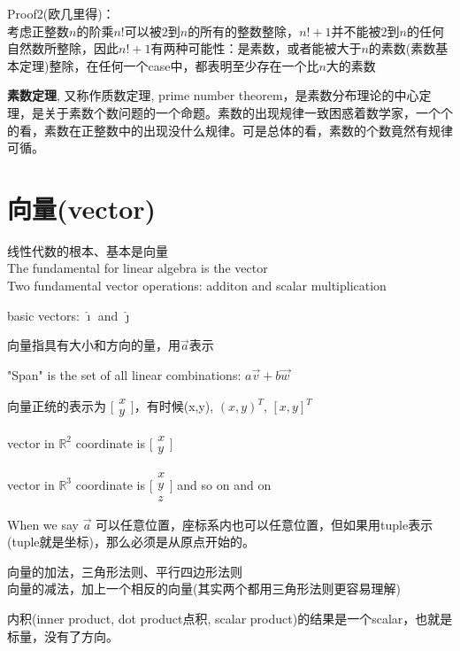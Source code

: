 \documentclass[../main.tex]{subfiles}
\begin{document}
Proof2(欧几里得)：\\
考虑正整数$n$的阶乘$n!$可以被$2$到$n$的所有的整数整除，$n!+1$并不能被$2$到$n$的任何自然数所整除，因此$n!+1$有两种可能性：是素数，或者能被大于$n$的素数(素数基本定理)整除，在任何一个case中，都表明至少存在一个比$n$大的素数

\textbf{素数定理}, 又称作质数定理, prime number theorem，是素数分布理论的中心定理，是关于素数个数问题的一个命题。素数的出现规律一致困惑着数学家，一个个的看，素数在正整数中的出现没什么规律。可是总体的看，素数的个数竟然有规律可循。

\newpage
\section{向量(vector)}

线性代数的根本、基本是向量\\
The fundamental for linear algebra is the vector\\
Two fundamental vector operations: additon and scalar multiplication

basic vectors: $\hat{\imath}$ and $\hat{\jmath}$

向量指具有大小和方向的量，用$\vec{a}$表示

"Span" is the set of all linear combinations: $a\vec{v}+b\vec{w}$

向量正统的表示为 $\bigl[ \begin{smallmatrix}  x\\y \end{smallmatrix} \bigr]$，有时候(x,y), $(x,y)^{T}$, $[x,y]^T$

vector in $\mathbb{R}^2$ coordinate is $\bigl[ \begin{smallmatrix} x\\y \end{smallmatrix} \bigr]$

vector in $\mathbb{R}^3$ coordinate is $ \bigl[ \begin{smallmatrix} x\\y\\z \end{smallmatrix} \bigr]$ and so on and on

When we say $\vec a$ 可以任意位置，座标系内也可以任意位置，但如果用tuple表示(tuple就是坐标)，那么必须是从原点开始的。

向量的加法，三角形法则、平行四边形法则\\
向量的减法，加上一个相反的向量(其实两个都用三角形法则更容易理解)

内积(inner product, dot product点积, scalar product)的结果是一个scalar，也就是标量，没有了方向。
\end{document}
